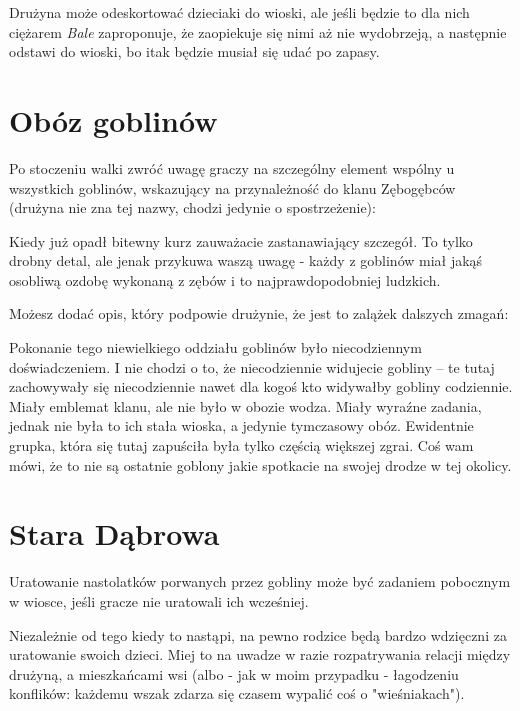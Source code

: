 \begin{twocolumn}
Drużyna może odeskortować dzieciaki do wioski, ale jeśli będzie to dla nich ciężarem \emph{Bale} zaproponuje, że
zaopiekuje się nimi aż nie wydobrzeją, a następnie odstawi do wioski, bo itak będzie musiał się udać po zapasy.

\section{Obóz goblinów}

Po stoczeniu walki zwróć uwagę graczy na szczególny element wspólny u wszystkich goblinów, wskazujący na przynależność
do klanu Zębogębców (drużyna nie zna tej nazwy, chodzi jedynie o spostrzeżenie):

\begin{DndReadAloud}
Kiedy już opadł bitewny kurz zauważacie zastanawiający szczegół. To tylko drobny detal, ale jenak przykuwa waszą uwagę -
każdy z goblinów miał jakąś osobliwą ozdobę wykonaną z zębów i to najprawdopodobniej ludzkich.
\end{DndReadAloud}

Możesz dodać opis, który podpowie drużynie, że jest to zalążek dalszych zmagań:

\begin{DndReadAloud}
Pokonanie tego niewielkiego oddziału goblinów było niecodziennym doświadczeniem. I nie chodzi o to, że niecodziennie
widujecie gobliny – te tutaj zachowywały się niecodziennie nawet dla kogoś kto widywałby gobliny codziennie. Miały
emblemat klanu, ale nie było w obozie wodza. Miały wyraźne zadania, jednak nie była to ich stała wioska, a jedynie
tymczasowy obóz. Ewidentnie grupka, która się tutaj zapuściła była tylko częścią większej zgrai. Coś wam mówi, że to nie
są ostatnie goblony jakie spotkacie na swojej drodze w tej okolicy.
\end{DndReadAloud}

\section{Stara Dąbrowa}

Uratowanie nastolatków porwanych przez gobliny może być zadaniem pobocznym w wiosce, jeśli gracze nie uratowali ich
wcześniej.

Niezależnie od tego kiedy to nastąpi, na pewno rodzice będą bardzo wdzięczni za uratowanie swoich dzieci. Miej to na
uwadze w razie rozpatrywania relacji między drużyną, a mieszkańcami wsi (albo - jak w moim przypadku - łagodzeniu
konflików: każdemu wszak zdarza się czasem wypalić coś o "wieśniakach").

\end{twocolumn}
